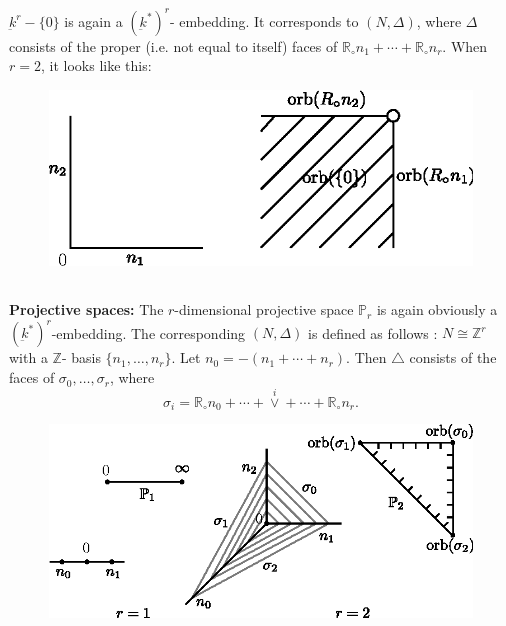  \subsection{}\label{chap1:subsec7.3} %
 $ \underbar{k}^{r}- \{0\}$ is again a $(\underbar{k}^{*})^{r}$-
 embedding. It corresponds to $(N, \Delta)$, where $\Delta$ consists
 of the proper (i.e. not equal to itself) faces of
 $\mathbb{R}_{\circ}n_{1} + \cdots + \mathbb{R}_{\circ}n_{r}$. When $r
 = 2$, it looks like this: 
 
\begin{figure}[H]
\centering 
\includegraphics{vol58-fig/fig58-4.eps} 
\end{figure}\pageoriginale


\subsection{}\label{chap1:subsec7.4} \textbf{Projective spaces:}
 The $r$-dimensional projective space $\mathbb{P}_{r}$ is again
 obviously a $(\underbar{k}^{*})^{r}$-embedding. The corresponding
 $(N, \Delta )$ is defined as follows : $N \cong \mathbb{Z}^{r}$ with
 a $\mathbb{Z}$- basis $\{n_{1}, \ldots , n_{r}\}$. Let $n_{0} =
 -(n_{1} + \cdots + n_{r})$. Then $\triangle$ consists of the faces of
 $\sigma_{0}, \ldots , \sigma_{r}$, where 
 $$
 \sigma_{i} = \mathbb{R}_{\circ}n_{0} + \cdots + \overset{i}{\vee} + 
 \cdots + \mathbb{R}_{\circ}n_{r}. 
 $$
\begin{figure}[H]
\centering 
\includegraphics{vol58-fig/fig58-5.eps} 
\end{figure}

